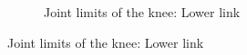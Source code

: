 \begin{figure}[ht!]
\begin{subfigure}[b]{0.49\textwidth}
        \caption{Joint limits of the knee: Lower link}
        \label{fig:joint_limits_knee_lower}
    \end{subfigure}
\end{figure}    

